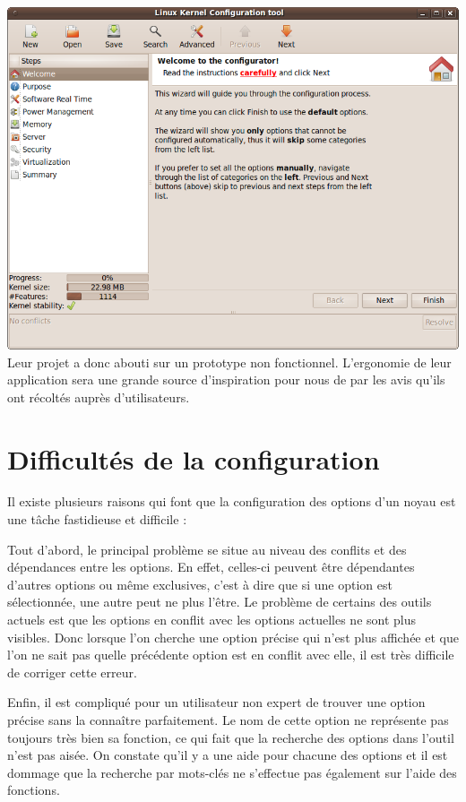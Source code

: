\documentclass[16pts]{report}
\begin{document}
\includegraphics[scale=0.6]{illustrations/lkc-config.png} \\

Leur projet a donc abouti sur un prototype non fonctionnel.
    L’ergonomie de leur application sera une grande source d’inspiration
    pour nous de par les avis qu’ils ont récoltés auprès d’utilisateurs.

\chapter{Difficultés de la configuration}

Il existe plusieurs raisons qui font que la configuration des options d’un noyau
    est une tâche fastidieuse et difficile :

Tout d’abord, le principal problème se situe au niveau des conflits et
    des dépendances entre les options. En effet, celles-ci peuvent
    être dépendantes d’autres options ou même exclusives, c’est à dire que si
    une option est sélectionnée, une autre peut ne plus l’être.
    Le problème de certains des outils actuels est que les options en conflit
    avec les options actuelles ne sont plus visibles. Donc lorsque l’on cherche
    une option précise qui n’est plus affichée et que l’on ne sait pas quelle
    précédente option est en conflit avec elle, il est très difficile de
    corriger cette erreur.

Enfin, il est compliqué pour un utilisateur non expert de trouver une
    option précise sans la connaître parfaitement. Le nom de cette option
    ne représente pas toujours très bien sa fonction, ce qui fait que
    la recherche des options dans l’outil n’est pas aisée.
    On constate qu’il y a une aide pour chacune des options et
    il est dommage que la recherche par mots-clés ne s’effectue pas également
    sur l’aide des fonctions.


\end{document}
